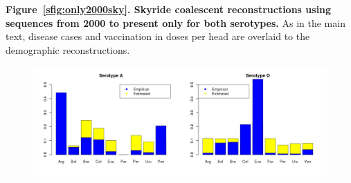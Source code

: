 \documentclass[a4paper,10pt]{article}
\begin{document}
\textbf{Figure~\ref{sfig:only2000sky}. Skyride coalescent reconstructions using sequences from 2000 to present only for both serotypes.}
As in the main text, disease cases and vaccination in doses per head are overlaid to the demographic reconstructions.

\newpage
\begin{center}
\begin{figure}[H]
\begin{center}
\includegraphics[scale=.35]{FIGURES/FMDV_frequencies_fixed.jpeg}
\end{center}
\caption{}
\label{sfig:freqs}
\end{figure}
\end{center}
\newpage
\end{document}
